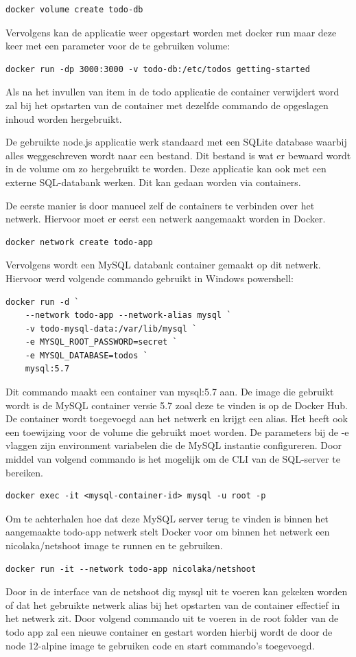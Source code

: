 \begin{verbatim}
docker volume create todo-db
\end{verbatim}
Vervolgens kan de applicatie weer opgestart worden met docker run maar deze keer met een parameter voor de te gebruiken volume:
\begin{verbatim}
docker run -dp 3000:3000 -v todo-db:/etc/todos getting-started
\end{verbatim}
Als na het invullen van item in de todo applicatie de container verwijdert word zal bij het opstarten van de container met dezelfde commando de opgeslagen inhoud worden hergebruikt.

De gebruikte node.js applicatie werk standaard met een SQLite database waarbij alles weggeschreven wordt naar een bestand. Dit bestand is wat er bewaard wordt in de volume om zo hergebruikt te worden. Deze applicatie kan ook met een externe SQL-databank werken. Dit kan gedaan worden via containers.

De eerste manier is door manueel zelf de containers te verbinden over het netwerk. Hiervoor moet er eerst een netwerk aangemaakt worden in Docker.
\begin{verbatim}
docker network create todo-app
\end{verbatim}
Vervolgens wordt een MySQL databank container gemaakt op dit netwerk. Hiervoor werd volgende commando gebruikt in Windows powershell:
\begin{lstlisting}
docker run -d `
    --network todo-app --network-alias mysql `
    -v todo-mysql-data:/var/lib/mysql `
    -e MYSQL_ROOT_PASSWORD=secret `
    -e MYSQL_DATABASE=todos `
    mysql:5.7
\end{lstlisting}
Dit commando maakt een container van mysql:5.7 aan. De image die gebruikt wordt is de MySQL container versie 5.7 zoal deze te vinden is op de Docker Hub. De container wordt toegevoegd aan het netwerk en krijgt een alias. Het heeft ook een toewijzing voor de volume die gebruikt moet worden. De parameters bij de -e vlaggen zijn environment variabelen die de MySQL instantie configureren. Door middel van volgend commando is het mogelijk om de CLI van de SQL-server te bereiken.

\begin{verbatim}
docker exec -it <mysql-container-id> mysql -u root -p
\end{verbatim}
Om te achterhalen hoe dat deze MySQL server terug te vinden is binnen het aangemaakte todo-app netwerk stelt Docker voor om binnen het netwerk een nicolaka/netshoot image te runnen en te gebruiken.
\begin{verbatim}
docker run -it --network todo-app nicolaka/netshoot
\end{verbatim}
Door in de interface van de netshoot dig mysql uit te voeren kan gekeken worden of dat het gebruikte netwerk alias bij het opstarten van de container effectief in het netwerk zit. Door volgend commando uit te voeren in de root folder van de todo app zal een nieuwe container en gestart worden hierbij wordt de door de node 12-alpine image te gebruiken code en start commando's toegevoegd.

